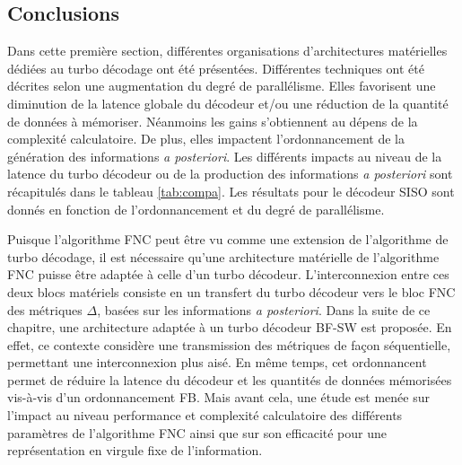 \subsection{Conclusions}
Dans cette première section, différentes organisations d'architectures matérielles dédiées au turbo décodage ont été présentées.
Différentes techniques ont été décrites selon une augmentation du degré de parallélisme. Elles favorisent une diminution de la 
latence globale du décodeur et/ou une réduction de la quantité de données à mémoriser. Néanmoins les gains s’obtiennent
au dépens de la complexité calculatoire. De plus, elles impactent l'ordonnancement de la génération des informations 
\textit{a posteriori}. Les différents impacts au niveau de la latence du turbo décodeur ou de la production des informations
\textit{a posteriori} sont récapitulés dans le tableau \ref{tab:compa}. Les résultats pour le décodeur SISO sont donnés en fonction de l'ordonnancement et du degré de
parallélisme.

Puisque l'algorithme FNC peut être vu comme une extension de l'algorithme de turbo décodage, il est nécessaire qu'une architecture 
matérielle de l'algorithme FNC puisse être adaptée à celle d'un turbo décodeur. L'interconnexion entre ces deux blocs 
matériels consiste en un transfert du turbo décodeur vers le bloc FNC des métriques $\Delta$, basées sur les 
informations \textit{a posteriori}. Dans la suite de ce chapitre, une architecture adaptée à un turbo décodeur BF-SW 
 est proposée. En effet, ce contexte considère une transmission des métriques de façon séquentielle, permettant une 
 interconnexion plus aisé. En même temps, cet ordonnancent permet de réduire la latence du décodeur et les quantités de données mémorisées vis-à-vis d'un ordonnancement FB.
Mais avant cela, une étude est menée sur l'impact au niveau performance et complexité calculatoire des différents paramètres de l'algorithme FNC ainsi que sur son 
efficacité pour une représentation en virgule fixe de l'information.


